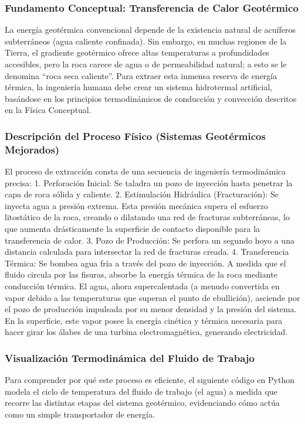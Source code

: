 \documentclass[12pt,a4paper]{article}
\begin{document}
\subsubsection*{Fundamento Conceptual: Transferencia de Calor Geotérmico}
La energía geotérmica convencional depende de la existencia natural de acuíferos subterráneos (agua caliente confinada). Sin embargo, en muchas regiones de la Tierra, el gradiente geotérmico ofrece altas temperaturas a profundidades accesibles, pero la roca carece de agua o de permeabilidad natural; a esto se le denomina ``roca seca caliente''. Para extraer esta inmensa reserva de energía térmica, la ingeniería humana debe crear un sistema hidrotermal artificial, basándose en los principios termodinámicos de conducción y convección descritos en la Física Conceptual.

\subsubsection*{Descripción del Proceso Físico (Sistemas Geotérmicos Mejorados)}
El proceso de extracción consta de una secuencia de ingeniería termodinámica precisa:
1. Perforación Inicial: Se taladra un pozo de inyección hasta penetrar la capa de roca sólida y caliente.
2. Estimulación Hidráulica (Fracturación): Se inyecta agua a presión extrema. Esta presión mecánica supera el esfuerzo litostático de la roca, creando o dilatando una red de fracturas subterráneas, lo que aumenta drásticamente la superficie de contacto disponible para la transferencia de calor.
3. Pozo de Producción: Se perfora un segundo hoyo a una distancia calculada para intersectar la red de fracturas creada.
4. Transferencia Térmica: Se bombea agua fría a través del pozo de inyección. A medida que el fluido circula por las fisuras, absorbe la energía térmica de la roca mediante conducción térmica. El agua, ahora supercalentada (a menudo convertida en vapor debido a las temperaturas que superan el punto de ebullición), asciende por el pozo de producción impulsada por su menor densidad y la presión del sistema. En la superficie, este vapor posee la energía cinética y térmica necesaria para hacer girar los álabes de una turbina electromagnética, generando electricidad.

\subsubsection*{Visualización Termodinámica del Fluido de Trabajo}
Para comprender por qué este proceso es eficiente, el siguiente código en Python modela el ciclo de temperatura del fluido de trabajo (el agua) a medida que recorre las distintas etapas del sistema geotérmico, evidenciando cómo actúa como un simple transportador de energía.
\end{document}

